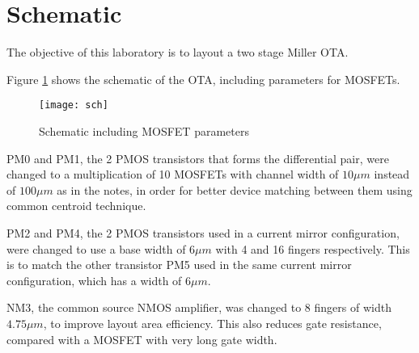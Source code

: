 \section{Schematic}

The objective of this laboratory is to layout a two stage Miller OTA.

Figure \ref{fig:sch} shows the schematic of the OTA, including parameters for MOSFETs.

\begin{figure}[!htb]
	\centering
	\texttt{[image: sch]}
	\caption{Schematic including MOSFET parameters}
	\label{fig:sch}
\end{figure}

PM0 and PM1, the 2 PMOS transistors that forms the differential pair, were changed to a multiplication of 10 MOSFETs with channel width of $10 \mu m$ instead of $100 \mu m$ as in the notes, in order for better device matching between them using common centroid technique.

PM2 and PM4, the 2 PMOS transistors used in a current mirror configuration, were changed to use a base width of $6 \mu m$ with 4 and 16 fingers respectively. This is to match the other transistor PM5 used in the same current mirror configuration, which has a width of $6 \mu m$.

NM3, the common source NMOS amplifier, was changed to 8 fingers of width $4.75 \mu m$, to improve layout area efficiency. This also reduces gate resistance, compared with a MOSFET with very long gate width.
